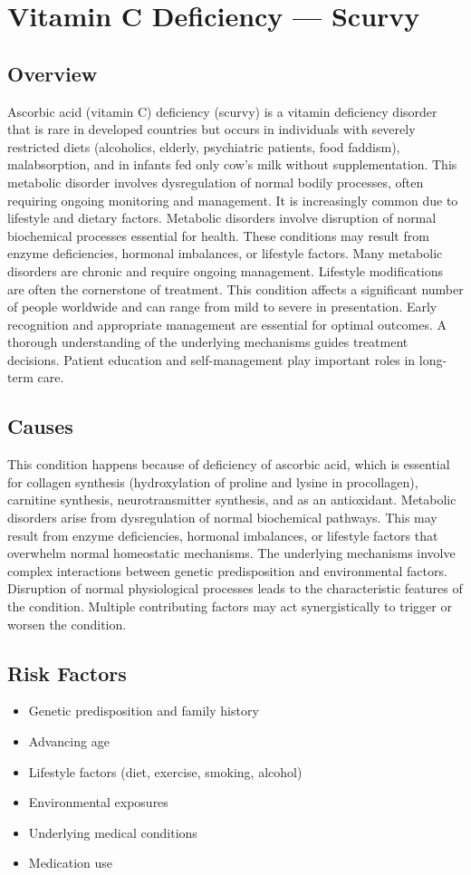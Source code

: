 \chapter{Vitamin C Deficiency --- Scurvy}
\label{sec:Vitamin C Deficiency}

\section{Overview}
Ascorbic acid (vitamin C) deficiency (scurvy) is a vitamin deficiency disorder that is rare in developed countries but occurs in individuals with severely restricted diets (alcoholics, elderly, psychiatric patients, food faddism), malabsorption, and in infants fed only cow's milk without supplementation. This metabolic disorder involves dysregulation of normal bodily processes, often requiring ongoing monitoring and management. It is increasingly common due to lifestyle and dietary factors. Metabolic disorders involve disruption of normal biochemical processes essential for health. These conditions may result from enzyme deficiencies, hormonal imbalances, or lifestyle factors. Many metabolic disorders are chronic and require ongoing management. Lifestyle modifications are often the cornerstone of treatment. This condition affects a significant number of people worldwide and can range from mild to severe in presentation. Early recognition and appropriate management are essential for optimal outcomes. A thorough understanding of the underlying mechanisms guides treatment decisions. Patient education and self-management play important roles in long-term care.
\section{Causes}
This condition happens because of deficiency of ascorbic acid, which is essential for collagen synthesis (hydroxylation of proline and lysine in procollagen), carnitine synthesis, neurotransmitter synthesis, and as an antioxidant. Metabolic disorders arise from dysregulation of normal biochemical pathways. This may result from enzyme deficiencies, hormonal imbalances, or lifestyle factors that overwhelm normal homeostatic mechanisms. The underlying mechanisms involve complex interactions between genetic predisposition and environmental factors. Disruption of normal physiological processes leads to the characteristic features of the condition. Multiple contributing factors may act synergistically to trigger or worsen the condition.
\section{Risk Factors}
\begin{itemize}[noitemsep]
  \item Genetic predisposition and family history
  \item Advancing age
  \item Lifestyle factors (diet, exercise, smoking, alcohol)
  \item Environmental exposures
  \item Underlying medical conditions
  \item Medication use
\end{itemize}
